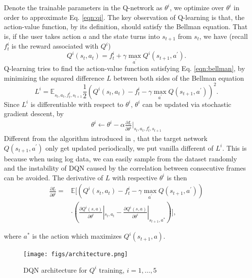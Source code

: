 \documentclass{sigchi}
\begin{document}
Denote the trainable parameters in the Q-network as $\theta^i$, we optimize over $\theta^i$ in order to approximate Eq. \eqref{eqn:qi}.
The key observation of Q-learning is that, the action-value function, by its definition, should satisfy the Bellman equation.
That is, if the user takes action $a$ and the state turns into $s_{t+1}$ from $s_t$, we have (recall $f_t^i$ is the reward associated with $Q^i$)
\begin{equation}
Q^i(s_t,a_t)=f_t^i + \gamma \max_{a^\prime}Q^i(s_{t+1}, a^\prime). \label{eqn:bellman}
\end{equation}
Q-learning tries to find the action-value function satisfying Eq. \eqref{eqn:bellman}, by minimizing the squared difference $L$ between both sides of the Bellman equation
\begin{equation*}
L^i=\mathbb{E}_{s_t, a_t, f_t^i, s_{t+1}} \frac{1}{2}(Q^i(s_t,a_t)- f_t^i - \gamma\max_{a^\prime}Q(s_{t+1}, a^\prime))^2.
\end{equation*}
Since $L^i$ is differentiable with respect to $\theta^i$, $\theta^i$ can be updated via stochastic gradient descent, by
\begin{eqnarray}
\theta^i \leftarrow \theta^i - \alpha\frac{\partial L}{\partial \theta^i}\Big|_{s_t, a_t, f_t^i, s_{t+1}}
\label{eqn:sgd}
\end{eqnarray}
Different from the algorithm introduced in \cite{mnih2015human}, that the target network $Q(s_{t+1}, a^\prime)$ only get updated periodically, we put vanilla different of $L^i$. 
This is because when using log data, we can easily sample from the dataset randomly and the instability of DQN caused by the correlation between consecutive frames can be avoided.
The derivative of $L$ with respective $\theta^i$ is then
\begin{equation*}
\begin{aligned}
\frac{\partial L}{\partial \theta^i} = & \mathbb{E}\Big[ (Q^i(s_t,a_t)- f_t^i - \gamma\max_{a^\prime}Q(s_{t+1}, a^\prime)) \\
& \cdot (\frac{\partial{Q^i(s,a)}}{\partial{\theta^i}}|_{s_t,a_t} - \frac{\partial{Q^i(s,a)}}{\partial{\theta^i}}|_{{s_{t+1},a^\ast}})\Big],
\end{aligned}
\end{equation*}

where $a^\ast$ is the action which maximizes $Q^i(s_{t+1},a)$.

\begin{figure}[t]
  \centering
  \texttt{[image: figs/architecture.png]}
  \caption{DQN architecture for $Q^i$ training, $i=1, \dots,5$}
  \label{fig:architecture}
\end{figure}
\end{document}
